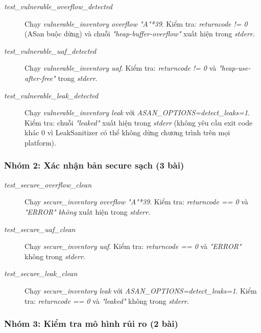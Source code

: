 \begin{description}
    \item[\textit{test\_vulnerable\_overflow\_detected}]
          Chạy \textit{vulnerable\_inventory overflow "A"*39}. Kiểm tra:
          \textit{returncode != 0} (ASan buộc dừng) và chuỗi
          \textit{"heap-buffer-overflow"} xuất hiện trong \textit{stderr}.

    \item[\textit{test\_vulnerable\_uaf\_detected}]
          Chạy \textit{vulnerable\_inventory uaf}. Kiểm tra:
          \textit{returncode != 0} và \textit{"heap-use-after-free"} trong
          \textit{stderr}.

    \item[\textit{test\_vulnerable\_leak\_detected}]
          Chạy \textit{vulnerable\_inventory leak} với
          \textit{ASAN\_OPTIONS=detect\_leaks=1}. Kiểm tra: chuỗi
          \textit{"leaked"} xuất hiện trong \textit{stderr} (không yêu cầu
          exit code khác 0 vì LeakSanitizer có thể không dừng chương trình
          trên mọi platform).
\end{description}

\subsubsection{Nhóm 2: Xác nhận bản secure sạch (3 bài)}

\begin{description}
    \item[\textit{test\_secure\_overflow\_clean}]
          Chạy \textit{secure\_inventory overflow "A"*39}. Kiểm tra:
          \textit{returncode == 0} và \textit{"ERROR"} \emph{không} xuất
          hiện trong \textit{stderr}.

    \item[\textit{test\_secure\_uaf\_clean}]
          Chạy \textit{secure\_inventory uaf}. Kiểm tra:
          \textit{returncode == 0} và \textit{"ERROR"} không trong
          \textit{stderr}.

    \item[\textit{test\_secure\_leak\_clean}]
          Chạy \textit{secure\_inventory leak} với
          \textit{ASAN\_OPTIONS=detect\_leaks=1}. Kiểm tra:
          \textit{returncode == 0} và \textit{"leaked"} không trong
          \textit{stderr}.
\end{description}

\subsubsection{Nhóm 3: Kiểm tra mô hình rủi ro (2 bài)}

